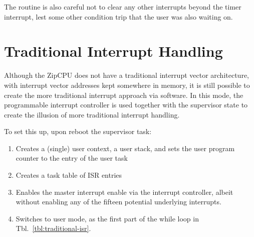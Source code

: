 \documentclass{gqtekspec}
\begin{document}
The routine is also careful not to clear any other interrupts beyond the timer
interrupt, lest some other condition trip that the user was also waiting on.
\section{Traditional Interrupt Handling}
Although the ZipCPU does not have a traditional interrupt vector architecture,
with interrupt vector addresses kept somewhere in memory, it is still
possible to create the more traditional interrupt approach via software.
In this mode, the programmable interrupt controller is used together with the
supervisor state to create the illusion of more traditional interrupt handling.

To set this up, upon reboot the supervisor task:
\begin{enumerate}
\item Creates a (single) user context, a user stack, and sets the user
	program counter to the entry of the user task
\item Creates a task table of ISR entries
\item Enables the master interrupt enable via the interrupt controller, albeit
	without enabling any of the fifteen potential underlying interrupts.
\item Switches to user mode, as the first part of the while loop in 
	Tbl.~\ref{tbl:traditional-isr}.
\end{enumerate}
\end{document}
